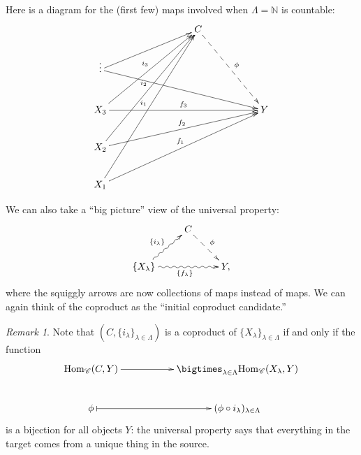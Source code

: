 \documentclass{amsart}[12pt]
\newcommand{\Hom}{\mathrm{Hom}}
\def\sC{\mathscr C}
\newcommand{\N}{\mathbb{N}}
\numberwithin{equation}{section}
\theoremstyle{plain} %
\theoremstyle{definition}
\theoremstyle{remark}
\newtheorem{rem}[equation]{Remark}
\begin{document}
Here is a diagram for the (first few) maps involved when $\Lambda=\N$ is countable:
\[\xymatrix{  & & & C \ar@{-->}[ddrr]^{\phi}& & \\
\vdots\ar[urrr] \ar[drrrrr]  & & & & & \\
X_3\ar[uurrr]^-{i_3} \ar[rrrrr]^-{f_3} & & & & & Y\\
X_2\ar[uuurrr]^-{i_2} \ar[urrrrr]^-{f_2}  & & & & & \\
X_1\ar[uuuurrr]^-{i_1} \ar[uurrrrr]^-{f_1} & & & & &}\]

We can also take a ``big picture'' view of the universal property:
\[\xymatrix{ & C\ar@{-->}[dr]^{\phi} & \\
\{ X_{\lambda}\} \ar@{~>}[ur]^{\{i_\lambda\}} \ar@{~>}[rr]_{\{f_\lambda\}} & & Y,}\]
where the squiggly arrows are now collections of maps instead of maps. We can again think of the coproduct as the ``initial coproduct candidate.''



\begin{rem}
Note that $(C,\{i_\lambda\}_{\lambda\in\Lambda})$ is a coproduct of $\{ X_\lambda\}_{\lambda\in \Lambda}$ if and only if the function
\[ \xymatrix{ \Hom_{\sC}(C,Y) \ar[rr] & & \bigtimes_{\lambda\in\Lambda} \Hom_{\sC}(X_\lambda,Y)\\
\phi \ar@{|->}[rr] & &  ( \phi \circ i_\lambda )_{\lambda\in \Lambda}}\]
is a bijection for all objects $Y$: the universal property says that everything in the target comes from a unique thing in the source.
\end{rem}
\end{document}
